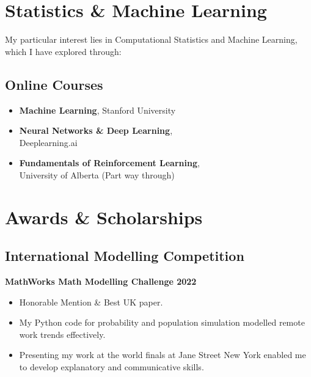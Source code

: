 \documentclass{Resume2}
\begin{document}
	\section{Statistics \& Machine Learning}
	    My particular interest lies in Computational Statistics and Machine Learning, which I have explored through:
			
		\subsection{Online Courses}
			\begin{itemize}[itemsep=1mm, parsep=0pt]
				\item \textbf{Machine Learning}, Stanford University
				\item \textbf{Neural Networks \& Deep Learning}, \\ Deeplearning.ai 
				\item \textbf{Fundamentals of Reinforcement Learning}, \\ University of Alberta (Part way through)
			\end{itemize}



	\section{Awards \& Scholarships}
		\subsection{International Modelling Competition}
			\textbf{MathWorks Math Modelling Challenge 2022} 
			\begin{itemize}
			    \item Honorable Mention \& Best UK paper.
			    \item My Python code for probability and population simulation modelled remote work trends effectively.
			    \item Presenting my work at the world finals at Jane Street New York enabled me to develop explanatory and communicative skills.
			\end{itemize}

\end{document}
